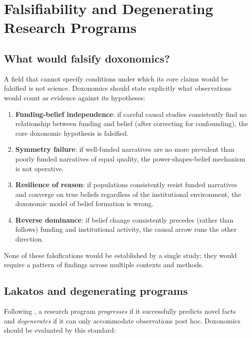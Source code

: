\section{Falsifiability and Degenerating Research Programs}
\label{sec:ch20-falsifiability}

\subsection{What would falsify doxonomics?}

A field that cannot specify conditions under which its core claims would be falsified is not science.
Doxonomics should state explicitly what observations would count as evidence against its hypotheses:

\begin{enumerate}
  \item \textbf{Funding-belief independence}: if careful causal studies consistently find no relationship between funding and belief (after correcting for confounding), the core doxonomic hypothesis is falsified.

  \item \textbf{Symmetry failure}: if well-funded narratives are no more prevalent than poorly funded narratives of equal quality, the power-shapes-belief mechanism is not operative.

  \item \textbf{Resilience of reason}: if populations consistently resist funded narratives and converge on true beliefs regardless of the institutional environment, the doxonomic model of belief formation is wrong.

  \item \textbf{Reverse dominance}: if belief change consistently precedes (rather than follows) funding and institutional activity, the causal arrow runs the other direction.
\end{enumerate}

None of these falsifications would be established by a single study; they would require a pattern of findings across multiple contexts and methods.

\subsection{Lakatos and degenerating programs}

Following \textcite{lakatos1978}, a research program \emph{progresses} if it successfully predicts novel facts and \emph{degenerates} if it can only accommodate observations post hoc.
Doxonomics should be evaluated by this standard:

